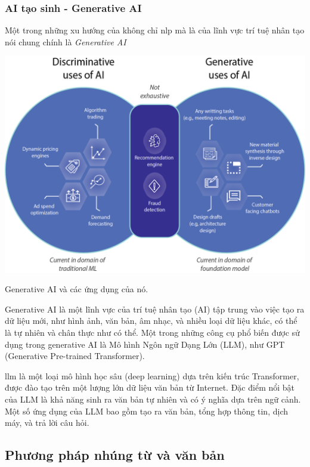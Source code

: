 \documentclass[a4paper, 12pt, openany]{book}
\begin{document}
\subsubsection{AI tạo sinh - Generative AI}

Một trong những xu hướng của không chỉ \acl{nlp} mà là của lĩnh vực trí tuệ nhân tạo nói chung chính là \textit{Generative AI}

\vspace{0.5cm}
\begin{minipage}{\linewidth}
    \captionsetup{type=figure}
    \centering
    \includegraphics[width=\linewidth]{./assets/images/generative-ai-benefits.png}
    \caption{Generative AI và các ứng dụng của nó.}
\end{minipage}
\vspace{0.5cm}

Generative AI là một lĩnh vực của trí tuệ nhân tạo (AI) tập trung vào việc tạo ra dữ liệu mới, như hình ảnh, văn bản, âm nhạc, và nhiều loại dữ liệu khác, có thể là tự nhiên và chân thực như có thể. Một trong những công cụ phổ biến được sử dụng trong generative AI là Mô hình Ngôn ngữ Dạng Lớn (LLM), như GPT (Generative Pre-trained Transformer).

\acl{llm} là một loại mô hình học sâu (deep learning) dựa trên kiến trúc Transformer, được đào tạo trên một lượng lớn dữ liệu văn bản từ Internet. Đặc điểm nổi bật của LLM là khả năng sinh ra văn bản tự nhiên và có ý nghĩa dựa trên ngữ cảnh. Một số ứng dụng của LLM bao gồm tạo ra văn bản, tổng hợp thông tin, dịch máy, và trả lời câu hỏi.

\subsection{Phương pháp nhúng từ và văn bản}
\end{document}
